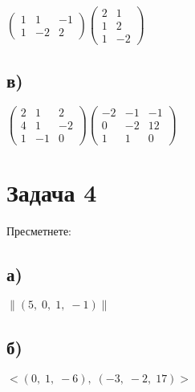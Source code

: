 \documentclass[12pt]{article}
\begin{document}
$\begin{pmatrix}
    1 & 1 & -1 \\
    1 & -2 & 2
\end{pmatrix}\begin{pmatrix}
    2 & 1 \\
    1 & 2 \\
    1 & -2
\end{pmatrix}$

\subsection*{в)}

$\begin{pmatrix}
    2 & 1 & 2\\
    4 & 1 & -2\\
    1 & -1 & 0
\end{pmatrix} \begin{pmatrix}
    -2 & -1 & -1 \\
    0 & -2 & 12 \\
    1 & 1 & 0
\end{pmatrix}$

\section*{Задача 4}

Пресметнете:

\subsection*{а)}

$\|(5, \; 0, \; 1, \; -1)\|$

\subsection*{б)}

$<(0, \; 1, \; -6), \; (-3, \; -2, \; 17)>$
\end{document}
